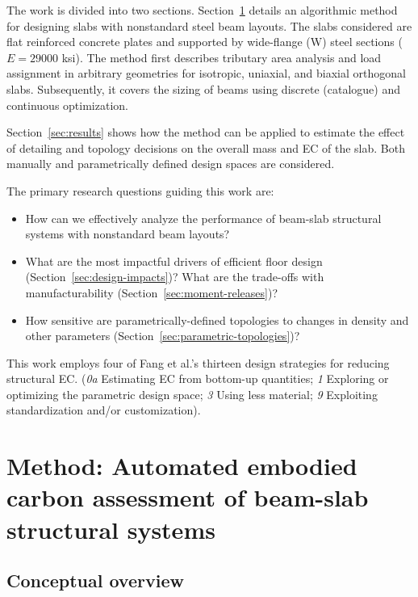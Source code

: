 \documentclass[10pt, letterpaper]{article} %
\begin{document}
    The work is divided into two sections. Section~\ref{sec:method} details an algorithmic method for designing slabs with nonstandard steel beam layouts. The slabs considered are flat reinforced concrete plates and supported by wide-flange (W) steel sections ($E = 29000$ ksi). The method first describes tributary area analysis and load assignment in arbitrary geometries for isotropic, uniaxial, and biaxial orthogonal slabs. Subsequently, it covers the sizing of beams using discrete (catalogue) and continuous optimization.

    Section~\ref{sec:results} shows how the method can be applied to estimate the effect of detailing and topology decisions on the overall mass and EC of the slab. Both manually and parametrically defined design spaces are considered.

    The primary research questions guiding this work are:

    \begin{itemize}
        \item How can we effectively analyze the performance of beam-slab structural systems with nonstandard beam layouts?
        \item What are the most impactful drivers of efficient floor design (Section~\ref{sec:design-impacts})? What are the trade-offs with manufacturability (Section~\ref{sec:moment-releases})?
        \item How sensitive are parametrically-defined topologies to changes in density and other parameters (Section~\ref{sec:parametric-topologies})?
    \end{itemize}

    This work employs four of Fang et al.’s thirteen design strategies for reducing structural EC. (\textit{0a} Estimating EC from bottom-up quantities; \textit{1} Exploring or optimizing the parametric design space; \textit{3} Using less material; \textit{9} Exploiting standardization and/or customization).\cite{demifangReducingEmbodiedCarbon2023}

    \section{Method: Automated embodied carbon assessment of beam-slab structural systems}\label{sec:method}

    \subsection{Conceptual overview}
\end{document}
